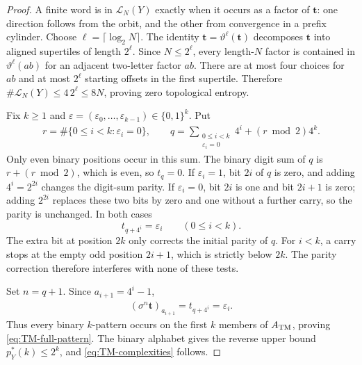 \documentclass[11pt,reqno]{amsart}
\numberwithin{equation}{section}
\theoremstyle{definition}
\newcommand{\Lcal}{\mathcal L}
\begin{document}
\begin{proof}
A finite word is in $\Lcal_N(Y)$ exactly when it occurs as a factor of
$\mathbf t$: one direction follows from the orbit, and the other from
convergence in a prefix cylinder.  Choose $\ell=\lceil\log_2N\rceil$.  The
identity $\mathbf t=\vartheta^\ell(\mathbf t)$ decomposes $\mathbf t$ into
aligned supertiles of length $2^\ell$.  Since $N\le2^\ell$, every length-$N$
factor is contained in $\vartheta^\ell(ab)$ for an adjacent two-letter factor
$ab$.  There are at most four choices for $ab$ and at most $2^\ell$ starting
offsets in the first supertile.  Therefore
$\#\Lcal_N(Y)\le4\,2^\ell\le8N$, proving zero topological entropy.

Fix $k\ge1$ and
$\varepsilon=(\varepsilon_0,\ldots,\varepsilon_{k-1})\in\{0,1\}^k$.
Put
\begin{align*}
 r=\#\{0\le i<k:\varepsilon_i=0\},
 \qquad
 q=\sum_{\substack{0\le i<k\\\varepsilon_i=0}}4^i
 +(r\bmod2)4^k.
\end{align*}
Only even binary positions occur in this sum.  The binary digit sum of $q$ is
$r+(r\bmod2)$, which is even, so $t_q=0$.  If $\varepsilon_i=1$, bit $2i$
of $q$ is zero, and adding $4^i=2^{2i}$ changes the digit-sum parity.  If
$\varepsilon_i=0$, bit $2i$ is one and bit $2i+1$ is zero; adding $2^{2i}$
replaces these two bits by zero and one without a further carry, so the parity
is unchanged.  In both cases
\begin{equation}\label{eq:TM-digit-identity}
 t_{q+4^i}=\varepsilon_i\qquad(0\le i<k).
\end{equation}
The extra bit at position $2k$ only corrects the initial parity of $q$.
For $i<k$, a carry stops at the empty odd position $2i+1$, which is
strictly below $2k$. The parity correction therefore interferes with
none of these tests.

Set $n=q+1$. Since $a_{i+1}=4^i-1$,
\begin{align*}
 (\sigma^n\mathbf t)_{a_{i+1}}
 =t_{q+4^i}=\varepsilon_i.
\end{align*}
Thus every binary $k$-pattern occurs on the first $k$ members of
$A_{\rm TM}$, proving \eqref{eq:TM-full-pattern}.  The binary alphabet gives
the reverse upper bound $p_Y^*(k)\le2^k$, and
\eqref{eq:TM-complexities} follows.
\end{proof}
\end{document}

